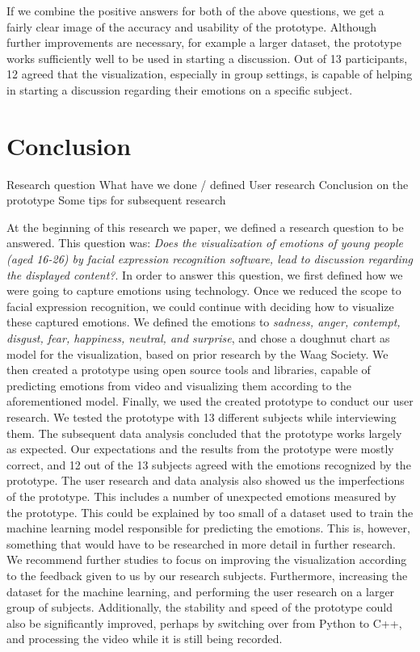 \documentclass[sigconf]{acmart}
\begin{document}
If we combine the positive answers for both of the above questions, we get a fairly clear image of the accuracy
and usability of the prototype. Although further improvements are necessary, for example a larger dataset,
the prototype works sufficiently well to be used in starting a discussion. Out of 13 participants, 12 agreed that
the visualization, especially in group settings, is capable of helping in starting a discussion regarding their
emotions on a specific subject.


\section{Conclusion}
Research question
What have we done / defined
User research
Conclusion on the prototype
Some tips for subsequent research

At the beginning of this research we paper, we defined a research question to be answered. This question was:
\emph{Does the visualization of emotions of young people (aged 16-26) by facial expression recognition software,
lead to discussion regarding the displayed content?}. In order to answer this question, we first defined how
we were going to capture emotions using technology. Once we reduced the scope to facial expression recognition,
we could continue with deciding how to visualize these captured emotions. We defined the emotions to
\emph{sadness, anger, contempt, disgust, fear, happiness, neutral, and surprise}, and chose a doughnut chart
as model for the visualization, based on prior research by the Waag Society. We then created a prototype
using open source tools and libraries, capable of predicting emotions from video and visualizing them according
to the aforementioned model.
Finally, we used the created prototype to conduct our user research. We tested the prototype with 13 different
subjects while interviewing them. The subsequent data analysis concluded that the prototype works largely as
expected. Our expectations and the results from the prototype were mostly correct, and 12 out of the 13 subjects
agreed with the emotions recognized by the prototype. The user research and data analysis also showed us the
imperfections of the prototype. This includes a number of unexpected emotions measured by the prototype.
This could be explained by too small of a dataset used to train the machine learning model responsible for
predicting the emotions. This is, however, something that would have to be researched in more detail in further
research.
We recommend further studies to focus on improving the visualization according to the feedback given to us by
our research subjects. Furthermore, increasing the dataset for the machine learning, and performing the user
research on a larger group of subjects. Additionally, the stability and speed of the prototype could also be
significantly improved, perhaps by switching over from Python to C++, and processing the video while it is still
being recorded.
\end{document}
